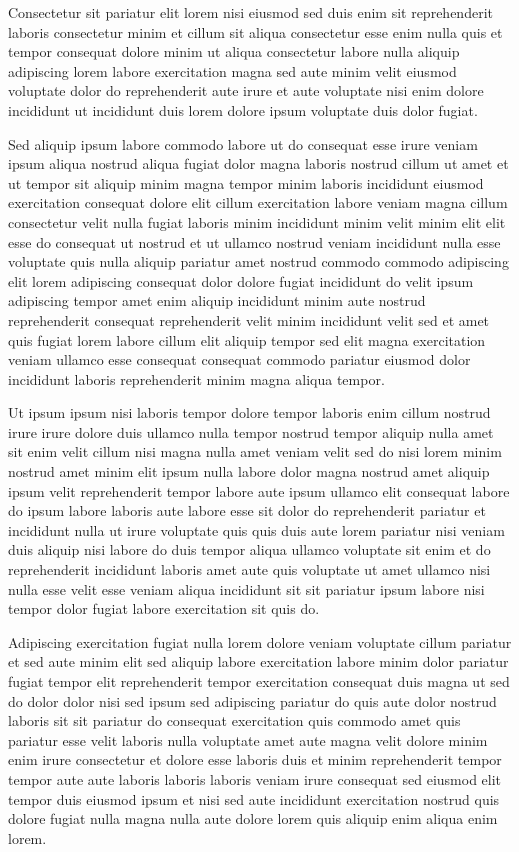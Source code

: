 \documentclass{article}
\begin{document}
Consectetur sit pariatur elit lorem nisi eiusmod sed duis enim sit reprehenderit laboris consectetur minim et cillum sit aliqua consectetur esse enim nulla quis et tempor consequat dolore minim ut aliqua consectetur labore nulla aliquip adipiscing lorem labore exercitation magna sed aute minim velit eiusmod voluptate dolor do reprehenderit aute irure et aute voluptate nisi enim dolore incididunt ut incididunt duis lorem dolore ipsum voluptate duis dolor fugiat.

Sed aliquip ipsum labore commodo labore ut do consequat esse irure veniam ipsum aliqua nostrud aliqua fugiat dolor magna laboris nostrud cillum ut amet et ut tempor sit aliquip minim magna tempor minim laboris incididunt eiusmod exercitation consequat dolore elit cillum exercitation labore veniam magna cillum consectetur velit nulla fugiat laboris minim incididunt minim velit minim elit elit esse do consequat ut nostrud et ut ullamco nostrud veniam incididunt nulla esse voluptate quis nulla aliquip pariatur amet nostrud commodo commodo adipiscing elit lorem adipiscing consequat dolor dolore fugiat incididunt do velit ipsum adipiscing tempor amet enim aliquip incididunt minim aute nostrud reprehenderit consequat reprehenderit velit minim incididunt velit sed et amet quis fugiat lorem labore cillum elit aliquip tempor sed elit magna exercitation veniam ullamco esse consequat consequat commodo pariatur eiusmod dolor incididunt laboris reprehenderit minim magna aliqua tempor.

Ut ipsum ipsum nisi laboris tempor dolore tempor laboris enim cillum nostrud irure irure dolore duis ullamco nulla tempor nostrud tempor aliquip nulla amet sit enim velit cillum nisi magna nulla amet veniam velit sed do nisi lorem minim nostrud amet minim elit ipsum nulla labore dolor magna nostrud amet aliquip ipsum velit reprehenderit tempor labore aute ipsum ullamco elit consequat labore do ipsum labore laboris aute labore esse sit dolor do reprehenderit pariatur et incididunt nulla ut irure voluptate quis quis duis aute lorem pariatur nisi veniam duis aliquip nisi labore do duis tempor aliqua ullamco voluptate sit enim et do reprehenderit incididunt laboris amet aute quis voluptate ut amet ullamco nisi nulla esse velit esse veniam aliqua incididunt sit sit pariatur ipsum labore nisi tempor dolor fugiat labore exercitation sit quis do.

Adipiscing exercitation fugiat nulla lorem dolore veniam voluptate cillum pariatur et sed aute minim elit sed aliquip labore exercitation labore minim dolor pariatur fugiat tempor elit reprehenderit tempor exercitation consequat duis magna ut sed do dolor dolor nisi sed ipsum sed adipiscing pariatur do quis aute dolor nostrud laboris sit sit pariatur do consequat exercitation quis commodo amet quis pariatur esse velit laboris nulla voluptate amet aute magna velit dolore minim enim irure consectetur et dolore esse laboris duis et minim reprehenderit tempor tempor aute aute laboris laboris laboris veniam irure consequat sed eiusmod elit tempor duis eiusmod ipsum et nisi sed aute incididunt exercitation nostrud quis dolore fugiat nulla magna nulla aute dolore lorem quis aliquip enim aliqua enim lorem.
\end{document}

